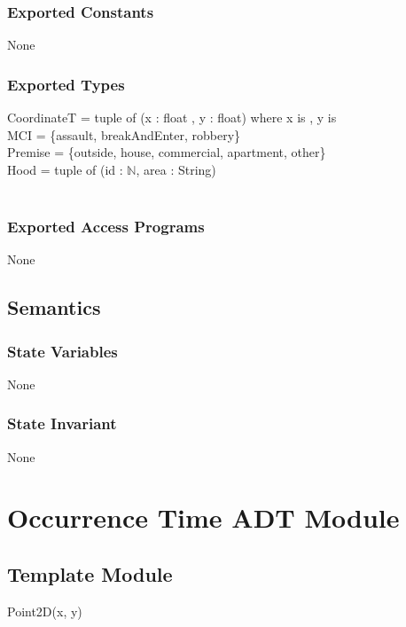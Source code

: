 \documentclass[12pt]{article}
\begin{document}
\subsubsection* {Exported Constants}

None

\subsubsection* {Exported Types}

CoordinateT = tuple of (x : float , y : float)     where x is , y is \\
MCI = \{assault, breakAndEnter, robbery\}\\ 
Premise = \{outside, house, commercial, apartment, other\}\\
Hood =  tuple of  (id : $\mathbb{N}$, area : String)\\
~\\
\subsubsection* {Exported Access Programs}

None

\subsection* {Semantics}

\subsubsection* {State Variables}

None

\subsubsection* {State Invariant}

None

\newpage

\section* {Occurrence Time ADT Module}

\subsection*{Template Module}

Point2D(x, y)
\end{document}
